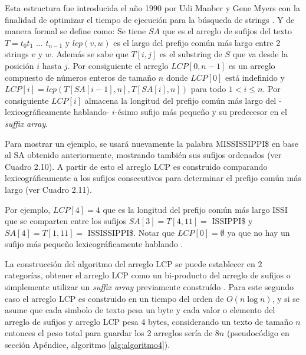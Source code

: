 Esta estructura fue introducida el año 1990 por Udi Manber y Gene Myers con la finalidad de optimizar el tiempo de ejecución para la búsqueda de strings \cite{suffixarray1}. Y de manera formal se define como: Se tiene $SA$ que es el arreglo de sufijos del texto $T=t_{0}t_{1}$ $\ldots$ $t_{n-1}$ y $lcp(v,w)$ es el largo del prefijo común más largo entre 2 strings $v$ y $w$. Además se sabe que $T[i,j]$ es el substring de $S$ que va desde la posición $i$ hasta $j$. Por consiguiente el arreglo $LCP[0,n-1]$ es un arreglo compuesto de números enteros de tamaño $n$ donde $LCP[0]$ está indefinido y $LCP[i] = lcp(T[SA[i-1],n], T[SA[i],n])$ para todo $1 < i \leq n$. Por consiguiente $LCP[i]$ almacena la longitud del prefijo común más largo del -lexicográficamente hablando-  $i$-ésimo sufijo más pequeño y su predecesor en el \textit{suffix array}.

Para mostrar un ejemplo, se usará nuevamente la palabra MISSISSIPPI\$ en base al SA obtenido anteriormente, mostrando también sus sufijos ordenados (ver Cuadro 2.10). A partir de esto el arreglo LCP es construido comparando lexicográficamente a los sufijos consecutivos para determinar el prefijo común más largo (ver Cuadro 2.11).

Por ejemplo, $LCP[4] = 4$ que es la longitud del prefijo común más largo ISSI que se comparten entre los sufijos $SA[3] = T[4,11] =$ ISSIPPI\$ y $SA[4] = T[1,11] =$ ISSISSIPPI\$. Notar que $LCP[0] = \emptyset$ ya que no hay un sufijo más pequeño lexicográficamente hablando \cite{lcparray}.

La construcción del algoritmo del arreglo LCP se puede establecer en 2 categorías, obtener el arreglo LCP como un bi-producto del arreglo de sufijos \cite{suffixarray1} o simplemente utilizar un \textit{suffix array} previamente construído \cite{kasai}. Para este segundo caso el arreglo LCP es construido en un tiempo del orden de $O(n \log n)$, y si se asume que cada simbolo de texto pesa un byte y cada valor o elemento del arreglo de sufijos y arreglo LCP pesa 4 bytes, considerando un texto de tamaño $n$ entonces el peso total para guardar los 2 arreglos sería de $8n$ (pseudocódigo en sección Apéndice, algoritmo \ref{alg:algoritmo4}).

